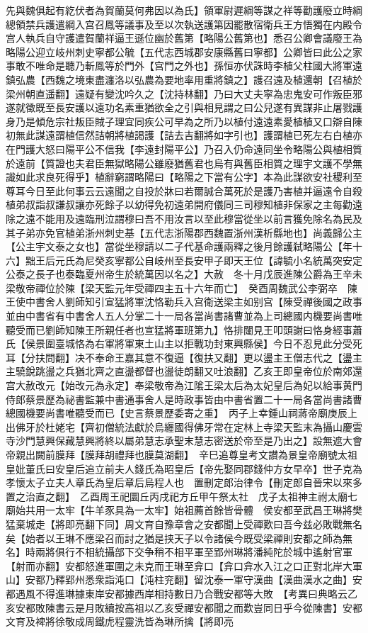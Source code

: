 先與魏俱起有紇伏者為賀蘭莫何弗因以為氏】領軍尉遲綱等謀之祥等勸護廢立時綱總領禁兵護遣綱入宫召鳳等議事及至以次執送護第因罷散宿衛兵王方悟獨在内殿令宫人執兵自守護遣賀蘭祥逼王遜位幽於舊第【略陽公舊第也】悉召公卿會議廢王為略陽公迎立岐州刺史寧都公毓【五代志西城郡安康縣舊曰寧都】公卿皆曰此公之家事敢不唯命是聽乃斬鳳等於門外【宫門之外也】孫恒亦伏誅時李植父柱國大將軍遠鎮弘農【西魏之境東盡瀍洛以弘農為要地率用重將鎮之】護召遠及植還朝【召植於梁州朝直遥翻】遠疑有變沈吟久之【沈持林翻】乃曰大丈夫寜為忠鬼安可作叛臣邪遂就徵既至長安護以遠功名素重猶欲全之引與相見謂之曰公兒遂有異謀非止屠戮護身乃是傾危宗社叛臣賊子理宜同疾公可早為之所乃以植付遠遠素愛植植又口辯自陳初無此謀遠謂植信然詰朝將植謁護【詰去吉翻將如字引也】護謂植已死左右白植亦在門護大怒曰陽平公不信我【李遠封陽平公】乃召入仍命遠同坐令略陽公與植相質於遠前【質證也夫君臣無獄略陽公雖廢猶舊君也烏有與舊臣相質之理宇文護不學無識如此求良死得乎】植辭窮謂略陽曰【略陽之下當有公字】本為此謀欲安社稷利至尊耳今日至此何事云云遠聞之自投於牀曰若爾誠合萬死於是護乃害植并逼遠令自殺植弟叔詣叔謙叔讓亦死餘子以幼得免初遠弟開府儀同三司穆知植非保家之主每勸遠除之遠不能用及遠臨刑泣謂穆曰吾不用汝言以至此穆當從坐以前言獲免除名為民及其子弟亦免官植弟浙州刺史基【五代志浙陽郡西魏置浙州漢析縣地也】尚義歸公主【公主宇文泰之女也】當從坐穆請以二子代基命護兩釋之後月餘護弑略陽公【年十六】黜王后元氏為尼癸亥寧都公自岐州至長安甲子即天王位【諱毓小名統萬突安定公泰之長子也泰臨夏州帝生於統萬因以名之】大赦　冬十月戊辰進陳公爵為王辛未梁敬帝禪位於陳【梁天監元年受禪四主五十六年而亡】　癸酉周魏武公李弼卒　陳王使中書舍人劉師知引宣猛將軍沈恪勒兵入宫衛送梁主如别宫【陳受禪後國之政事並由中書省有中書舍人五人分掌二十一局各當尚書諸曹並為上司總國内機要尚書唯聽受而已劉師知陳王所親任者也宣猛將軍班第九】恪排闥見王叩頭謝曰恪身經事蕭氏【侯景圍臺城恪為右軍將軍東土山主以拒戰功封東興縣侯】今日不忍見此分受死耳【分扶問翻】决不奉命王嘉其意不復逼【復扶又翻】更以盪主王僧志代之【盪主主驍銳跳盪之兵猶北齊之直盪都督也盪徒朗翻又吐浪翻】乙亥王即皇帝位於南郊還宫大赦改元【始改元為永定】奉梁敬帝為江隂王梁太后為太妃皇后為妃以給事黄門侍郎蔡景歷為祕書監兼中書通事舍人是時政事皆由中書省置二十一局各當尚書諸曹總國機要尚書唯聽受而已【史言蔡景歷委寄之重】　丙子上幸鍾山祠蔣帝廟庚辰上出佛牙於杜姥宅【齊初僧統法獻於烏纒國得佛牙常在定林上寺梁天監末為攝山慶雲寺沙門慧興保藏慧興將終以屬弟慧志承聖末慧志密送於帝至是乃出之】設無遮大會帝親出闕前膜拜【膜拜胡禮拜也膜莫湖翻】　辛巳追尊皇考文讃為景皇帝廟號太祖皇妣董氏曰安皇后追立前夫人錢氏為昭皇后【帝先娶同郡錢仲方女早卒】世子克為孝懷太子立夫人章氏為皇后章后烏程人也　置刪定郎治律令【刪定郎自晉宋以來多置之治直之翻】　乙酉周王祀圜丘丙戌祀方丘甲午祭太社　戊子太祖神主祔太廟七廟始共用一太牢【牛羊豕具為一太牢】始祖薦首餘皆骨體　侯安都至武昌王琳將樊猛棄城走【將即亮翻下同】周文育自豫章會之安都聞上受禪歎曰吾今兹必敗戰無名矣【始者以王琳不應梁召而討之猶是挟天子以令諸侯今既受梁禪則安都之師為無名】時兩將俱行不相統攝部下交争稍不相平軍至郢州琳將潘純陀於城中遙射官軍【射而亦翻】安都怒進軍圍之未克而王琳至弇口【弇口弇水入江之口正對北岸大軍山】安都乃釋郢州悉衆詣沌口【沌柱兖翻】留沈泰一軍守漢曲【漢曲漢水之曲】安都遇風不得進琳據東岸安都據西岸相持數日乃合戰安都等大敗　【考異曰典略云乙亥安都敗陳書云是月敗續按高祖以乙亥受禪安都聞之而歎豈同日乎今從陳書】安都文育及裨將徐敬成周鐵虎程靈洗皆為琳所擒【將即亮